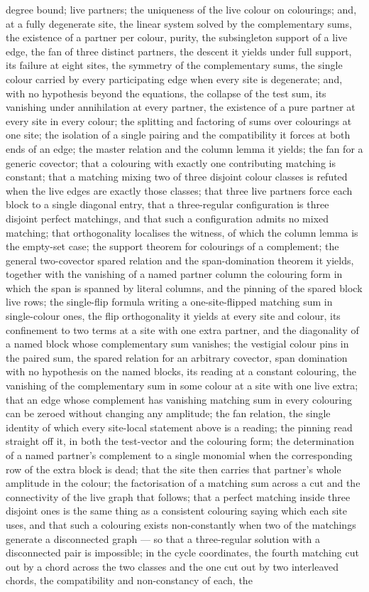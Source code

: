 \documentclass[11pt]{article}
\theoremstyle{definition}
\theoremstyle{remark}
\begin{document}
degree bound; live partners; the uniqueness of the live colour on colourings; and, at a fully degenerate site, the linear system solved by the complementary sums, the existence of a partner per colour, purity, the subsingleton support of a live edge, the fan of three distinct partners, the descent it yields under full support, its failure at eight sites, the symmetry of the complementary sums, the single colour carried by every participating edge when every site is degenerate; and, with no hypothesis beyond the equations, the collapse of the test sum, its vanishing under annihilation at every partner, the existence of a pure partner at every site in every colour; the splitting and factoring of sums over colourings at one site; the isolation of a single pairing and the compatibility it forces at both ends of an edge; the master relation and the column lemma it yields; the fan for a generic covector; that a colouring with exactly one contributing matching is constant; that a matching mixing two of three disjoint colour classes is refuted when the live edges are exactly those classes; that three live partners force each block to a single diagonal entry, that a three-regular configuration is three disjoint perfect matchings, and that such a configuration admits no mixed matching; that orthogonality localises the witness, of which the column lemma is the empty-set case; the support theorem for colourings of a complement; the general two-covector spared relation and the span-domination theorem it yields, together with the vanishing of a named partner column the colouring form in which the span is spanned by literal columns, and the pinning of the spared block live rows; the single-flip formula writing a one-site-flipped matching sum in single-colour ones, the flip orthogonality it yields at every site and colour, its confinement to two terms at a site with one extra partner, and the diagonality of a named block whose complementary sum vanishes; the vestigial colour pins in the paired sum, the spared relation for an arbitrary covector, span domination with no hypothesis on the named blocks, its reading at a constant colouring, the vanishing of the complementary sum in some colour at a site with one live extra; that an edge whose complement has vanishing matching sum in every colouring can be zeroed without changing any amplitude; the fan relation, the single identity of which every site-local statement above is a reading; the pinning read straight off it, in both the test-vector and the colouring form; the determination of a named partner's complement to a single monomial when the corresponding row of the extra block is dead; that the site then carries that partner's whole amplitude in the colour; the factorisation of a matching sum across a cut and the connectivity of the live graph that follows; that a perfect matching inside three disjoint ones is the same thing as a consistent colouring saying which each site uses, and that such a colouring exists non-constantly when two of the matchings generate a disconnected graph --- so that a three-regular solution with a disconnected pair is impossible; in the cycle coordinates, the fourth matching cut out by a chord across the two classes and the one cut out by two interleaved chords, the compatibility and non-constancy of each, the 
\end{document}
